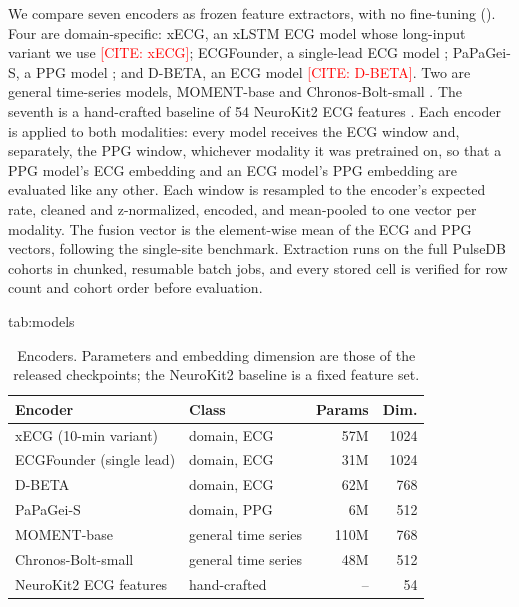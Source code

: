 \documentclass[pmlr,twocolumn,10pt]{jmlr}
\newcommand{\placeholder}[1]{\textcolor{red}{[#1]}}
\newcommand{\domainmodel}{xECG}
\newcommand{\tsmodel}{MOMENT}
\begin{document}
We compare seven encoders as frozen feature extractors, with no fine-tuning (). Four are domain-specific: \domainmodel{}, an xLSTM ECG model whose long-input variant we use \placeholder{CITE: xECG}; ECGFounder, a single-lead ECG model \citep{li2024ecgfounder}; PaPaGei-S, a PPG model \citep{pillai2024papagei}; and D-BETA, an ECG model \placeholder{CITE: D-BETA}. Two are general time-series models, \tsmodel{}-base \citep{goswami2024moment} and Chronos-Bolt-small \citep{ansari2024chronos}. The seventh is a hand-crafted baseline of 54 NeuroKit2 ECG features \citep{makowski2021neurokit}. Each encoder is applied to both modalities: every model receives the ECG window and, separately, the PPG window, whichever modality it was pretrained on, so that a PPG model's ECG embedding and an ECG model's PPG embedding are evaluated like any other. Each window is resampled to the encoder's expected rate, cleaned and z-normalized, encoded, and mean-pooled to one vector per modality. The fusion vector is the element-wise mean of the ECG and PPG vectors, following the single-site benchmark. Extraction runs on the full PulseDB cohorts in chunked, resumable batch jobs, and every stored cell is verified for row count and cohort order before evaluation.

\begin{table}[t]
\floatconts
  {tab:models}%
  {\caption{Encoders. Parameters and embedding dimension are those of the released checkpoints; the NeuroKit2 baseline is a fixed feature set.}}%
  {\footnotesize\setlength{\tabcolsep}{3pt}
  \begin{tabular*}{\linewidth}{@{\extracolsep{\fill}}llrr@{}}
  \toprule
  \textbf{Encoder} & \textbf{Class} & \textbf{Params} & \textbf{Dim.} \\
  \midrule
  \domainmodel{} (10-min variant) & domain, ECG & 57M & 1024 \\
  ECGFounder (single lead) & domain, ECG & 31M & 1024 \\
  D-BETA & domain, ECG & 62M & 768 \\
  PaPaGei-S & domain, PPG & 6M & 512 \\
  \tsmodel{}-base & general time series & 110M & 768 \\
  Chronos-Bolt-small & general time series & 48M & 512 \\
  NeuroKit2 ECG features & hand-crafted & -- & 54 \\
  \bottomrule
  \end{tabular*}}
\end{table}
\end{document}
